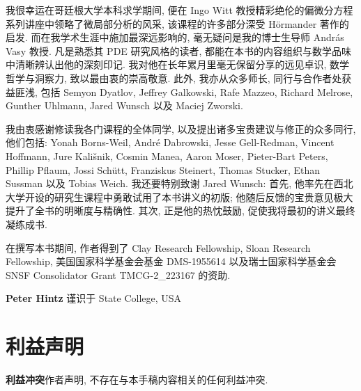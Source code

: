 我很幸运在哥廷根大学本科求学期间, 便在 Ingo Witt 教授精彩绝伦的偏微分方程系列讲座中领略了微局部分析的风采, 该课程的许多部分深受 Hörmander 著作的启发. 而在我学术生涯中施加最深远影响的, 毫无疑问是我的博士生导师 András Vasy 教授. 凡是熟悉其 PDE 研究风格的读者, 都能在本书的内容组织与数学品味中清晰辨认出他的深刻印记. 我对他在长年累月里毫无保留分享的远见卓识, 数学哲学与洞察力, 致以最由衷的崇高敬意. 此外, 我亦从众多师长, 同行与合作者处获益匪浅, 包括 Semyon Dyatlov, Jeffrey Galkowski, Rafe Mazzeo, Richard Melrose, Gunther Uhlmann, Jared Wunsch 以及 Maciej Zworski.

我由衷感谢修读我各门课程的全体同学, 以及提出诸多宝贵建议与修正的众多同行, 他们包括: Yonah Borns-Weil, André Dabrowski, Jesse Gell-Redman, Vincent Hoffmann, Jure Kališnik, Cosmin Manea, Aaron Moser, Pieter-Bart Peters, Phillip Pflaum, Jossi Schütt, Franziskus Steinert, Thomas Stucker, Ethan Sussman 以及 Tobias Weich. 我还要特别致谢 Jared Wunsch: 首先, 他率先在西北大学开设的研究生课程中勇敢试用了本书讲义的初版; 他随后反馈的宝贵意见极大提升了全书的明晰度与精确性. 其次, 正是他的热忱鼓励, 促使我将最初的讲义最终凝练成书.

在撰写本书期间, 作者得到了 Clay Research Fellowship, Sloan Research Fellowship, 美国国家科学基金会基金 DMS-1955614 以及瑞士国家科学基金会 SNSF Consolidator Grant TMCG-2\_223167 的资助.

\vspace{1.5em}
\hfill \textbf{Peter Hintz} \quad 谨识于 State College, USA

\cleardoublepage

\chapter*{利益声明}

\noindent\textbf{利益冲突}\quad 作者声明, 不存在与本手稿内容相关的任何利益冲突.
